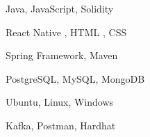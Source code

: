 \documentclass[11pt]{spidercv}
\begin{document}
    \begin{SideBar}{\ColorBackground}{\ColorTextSide}
        
        
        
        \vspace*{1cm}

        \begin{ItemList}{\ColorHighlight}
            \item [\faCode] Java, JavaScript, Solidity
            \item [\faFileCodeO]  React Native , HTML , CSS
            \item [\faCubes]  Spring Framework, Maven
            \item [\faDatabase]  PostgreSQL, MySQL, MongoDB
            \item [\faLinux]  Ubuntu, Linux, Windows
            \item [\faGears]  Kafka, Postman, Hardhat
        \end{ItemList}

        \vspace*{1cm}


        \begin{SpiderDiagram}{\ColorTextSide}{\ColorHighlight}
        \end{SpiderDiagram}

        \vspace*{1cm}


        \begin{SkillGauges}{\ColorHighlight}
        \end{SkillGauges}
    \end{SideBar}
\end{document}
